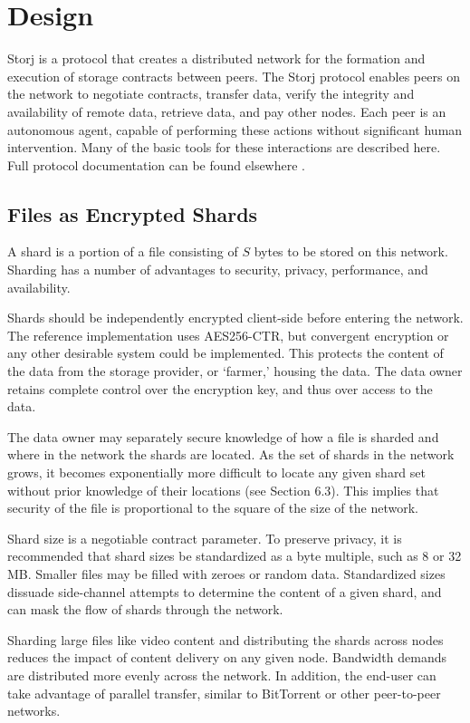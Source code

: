 \documentclass[a4paper,10pt]{article}
\begin{document}
\section{Design}
Storj is a protocol that creates a distributed network for the formation and execution of storage contracts between peers. The Storj protocol enables peers on the network to negotiate contracts, transfer data, verify the integrity and availability of remote data, retrieve data, and pay other nodes. Each peer is an autonomous agent, capable of performing these actions without significant human intervention. Many of the basic tools for these interactions are described here. Full protocol documentation can be found elsewhere \cite{1}.

\subsection{Files as Encrypted Shards}
A shard is a portion of a file consisting of $ S $ bytes to be stored on this network. Sharding has a number of advantages to security, privacy, performance, and availability.

Shards should be independently encrypted client-side before entering the network. The reference implementation uses AES256-CTR, but convergent encryption or any other desirable system could be implemented. This protects the content of the data from the storage provider, or ‘farmer,’ housing the data. The data owner retains complete control over the encryption key, and thus over access to the data.

The data owner may separately secure knowledge of how a file is sharded and where in the network the shards are located. As the set of shards in the network grows, it becomes exponentially more difficult to locate any given shard set without prior knowledge of their locations (see Section 6.3). This implies that security of the file is proportional to the square of the size of the network.

Shard size is a negotiable contract parameter. To preserve privacy, it is recommended that shard sizes be standardized as a byte multiple, such as 8 or 32 MB. Smaller files may be filled with zeroes or random data. Standardized sizes dissuade side-channel attempts to determine the content of a given shard, and can mask the flow of shards through the network.

Sharding large files like video content and distributing the shards across nodes reduces the impact of content delivery on any given node. Bandwidth demands are distributed more evenly across the network. In addition, the end-user can take advantage of parallel transfer, similar to BitTorrent or other peer-to-peer networks.
\end{document}
